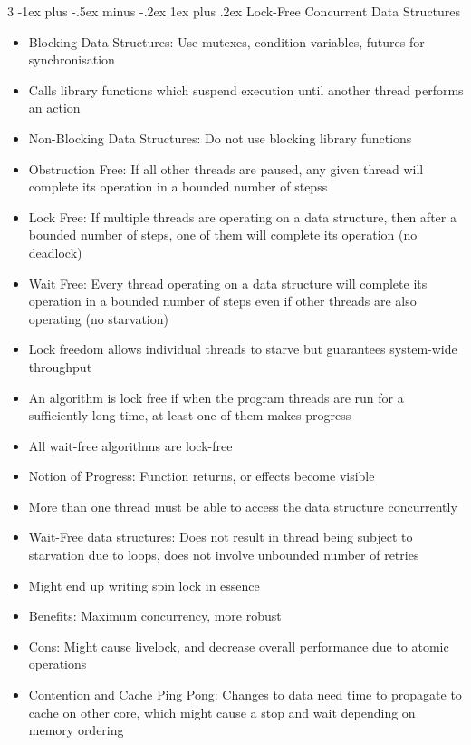 \documentclass[10pt, landscape]{article}
\makeatletter
\renewcommand{\subsection}{\@startsection{subsection}{3}{0mm}%
                                {-1ex plus -.5ex minus -.2ex}%
                                {1ex plus .2ex}%
                                {\normalfont\small\bfseries}}%
\makeatother
\begin{document}
\begin{multicols*}{3}
\subsection{Lock-Free Concurrent Data Structures}
\begin{itemize}
    \item Blocking Data Structures: Use mutexes, condition variables, futures for synchronisation
    \item Calls library functions which suspend execution until another thread performs an action
    \item Non-Blocking Data Structures: Do not use blocking library functions
    \item Obstruction Free: If all other threads are paused, any given thread will complete its operation in a bounded number of stepss
    \item Lock Free: If multiple threads are operating on a data structure, then after a bounded number of steps, one of them will complete its operation (no deadlock)
    \item Wait Free: Every thread operating on a data structure will complete its operation in a bounded number of steps even if other threads are also operating (no starvation)
    \item Lock freedom allows individual threads to starve but guarantees system-wide throughput
    \item An algorithm is lock free if when the program threads are run for a sufficiently long time, at least one of them makes progress
    \item All wait-free algorithms are lock-free
    \item Notion of Progress: Function returns, or effects become visible
    \item More than one thread must be able to access the data structure concurrently
    \item Wait-Free data structures: Does not result in thread being subject to starvation due to loops, does not involve unbounded number of retries
    \item Might end up writing spin lock in essence
    \item Benefits: Maximum concurrency, more robust
    \item Cons: Might cause livelock, and decrease overall performance due to atomic operations
    \item Contention and Cache Ping Pong: Changes to data need time to propagate to cache on other core, which might cause a stop and wait depending on memory ordering

\end{itemize}
\end{multicols*}
\end{document}

